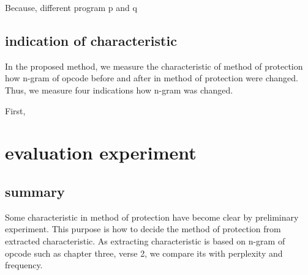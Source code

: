 \documentclass[conference]{IEEEtran}
\begin{document}
Because, different program p and q

\subsection{indication of characteristic}
In the proposed method, we measure the characteristic of method of protection how n-gram of opcode before and after in method of protection were changed.
Thus, we measure four indications how n-gram was changed.


First,

%
%
%
%
%
%
%
%


\section{evaluation experiment}
\subsection{summary}
Some characteristic in method of protection have become clear by preliminary experiment.
This purpose is how to decide the method of protection from extracted characteristic.
As extracting characteristic is based on n-gram of opcode such as 
chapter three, verse 2, 
we compare its with perplexity and frequency.
\end{document}
